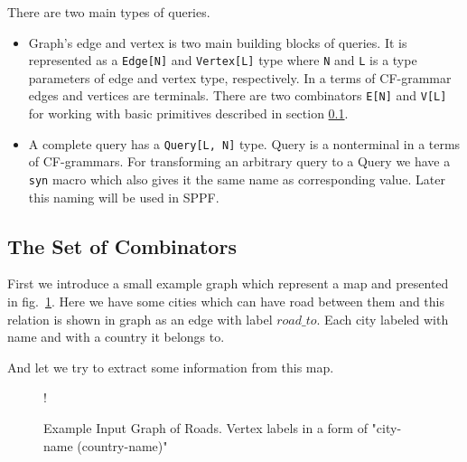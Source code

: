 There are two main types of queries.
\begin{itemize}
\item Graph's edge and vertex is two main building blocks of queries. 
It is represented as a \lstinline{Edge[N]} and \lstinline{Vertex[L]} type where \lstinline{N} and \lstinline{L} is a type parameters of edge and vertex type, respectively. 
In a terms of CF-grammar edges and vertices are terminals.
There are two combinators \lstinline{E[N]} and \lstinline{V[L]} for working with basic primitives described in section \ref{sec:combinators}.
\item A complete query has a \lstinline{Query[L, N]} type.
Query is a nonterminal in a terms of CF-grammars.
For transforming an arbitrary query to a Query we have a \lstinline{syn} macro which also gives it the same name as corresponding value.
Later this naming will be used in SPPF.
\end{itemize}

\subsection{The Set of Combinators}
\label{sec:combinators}

First we introduce a small example graph which represent a map and presented in fig.~\ref{fig:graph}.
Here we have some cities which can have road between them and this relation is shown in graph as an edge with label $road\_to$.
Each city labeled with name and with a country it belongs to.

And let we try to extract some information from this map.


\begin{figure}[h]
 {!}
{
}
\caption{Example Input Graph of Roads. Vertex labels in a form of "city-name (country-name)"}
\label{fig:graph}
\end{figure}

